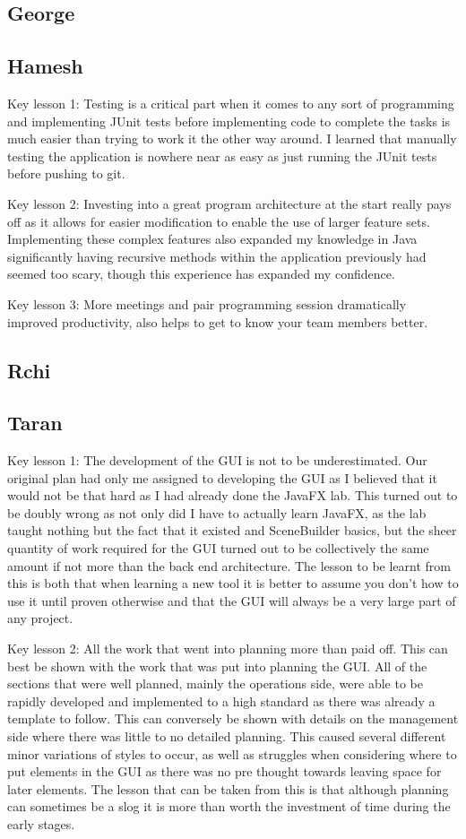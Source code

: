 \subsection{George}

\subsection{Hamesh}
Key lesson 1:
Testing is a critical part when it comes to any sort of programming and implementing JUnit tests before implementing code to complete the tasks is much easier than trying to work it the other way around. I learned that manually testing the application is nowhere near as easy as just running the JUnit tests before pushing to git.

Key lesson 2:
Investing into a great program architecture at the start really pays off as it allows for easier modification to enable the use of larger feature sets. Implementing these complex features also expanded my knowledge in Java significantly having recursive methods within the application previously had seemed too scary, though this experience has expanded my confidence.

Key lesson 3:
More meetings and pair programming session dramatically improved productivity, also helps to get to know your team members better.

\subsection{Rchi}

\subsection{Taran}
Key lesson 1:
The development of the GUI is not to be underestimated. Our original plan had only me assigned to developing the GUI as I believed that it would not be that hard as I had already done the JavaFX lab. This turned out to be doubly wrong as not only did I have to actually learn JavaFX, as the lab taught nothing but the fact that it existed and SceneBuilder basics, but the sheer quantity of work required for the GUI turned out to be collectively the same amount if not more than the back end architecture.
The lesson to be learnt from this is both that when learning a new tool it is better to assume you don't how to use it until proven otherwise and that the GUI will always be a very large part of any project.

Key lesson 2:
All the work that went into planning more than paid off. This can best be shown with the work that was put into planning the GUI. All of the sections that were well planned, mainly the operations side, were able to be rapidly developed and implemented to a high standard as there was already a template to follow. This can conversely be shown with details on the management side where there was little to no detailed planning. This caused several different minor variations of styles to occur, as well as struggles when considering where to put elements in the GUI as there was no pre thought towards leaving space for later elements.
The lesson that can be taken from this is that although planning can sometimes be a slog it is  more than worth the investment of time during the early stages.
